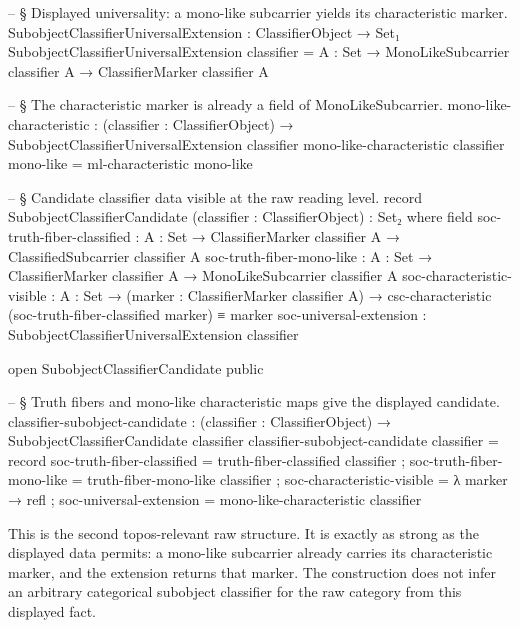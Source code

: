 \documentclass[11pt]{article}
\begin{document}
\begin{code}
-- § Displayed universality: a mono-like subcarrier yields its characteristic marker.
SubobjectClassifierUniversalExtension : ClassifierObject → Set₁
SubobjectClassifierUniversalExtension classifier =
  {A : Set} → MonoLikeSubcarrier classifier A → ClassifierMarker classifier A

-- § The characteristic marker is already a field of MonoLikeSubcarrier.
mono-like-characteristic :
  (classifier : ClassifierObject) → SubobjectClassifierUniversalExtension classifier
mono-like-characteristic classifier mono-like = ml-characteristic mono-like

-- § Candidate classifier data visible at the raw reading level.
record SubobjectClassifierCandidate (classifier : ClassifierObject) : Set₂ where
  field
    soc-truth-fiber-classified : {A : Set} →
                                 ClassifierMarker classifier A →
                                 ClassifiedSubcarrier classifier A
    soc-truth-fiber-mono-like  : {A : Set} →
                                 ClassifierMarker classifier A →
                                 MonoLikeSubcarrier classifier A
    soc-characteristic-visible : {A : Set} →
                                 (marker : ClassifierMarker classifier A) →
                                 csc-characteristic
                                   (soc-truth-fiber-classified marker) ≡ marker
    soc-universal-extension    : SubobjectClassifierUniversalExtension classifier

open SubobjectClassifierCandidate public

-- § Truth fibers and mono-like characteristic maps give the displayed candidate.
classifier-subobject-candidate :
  (classifier : ClassifierObject) → SubobjectClassifierCandidate classifier
classifier-subobject-candidate classifier = record
  { soc-truth-fiber-classified = truth-fiber-classified classifier
  ; soc-truth-fiber-mono-like  = truth-fiber-mono-like classifier
  ; soc-characteristic-visible = λ marker → refl
  ; soc-universal-extension    = mono-like-characteristic classifier
  }
\end{code}

This is the second topos-relevant raw structure.  It is exactly as strong as
the displayed data permits: a mono-like subcarrier already carries its
characteristic marker, and the extension returns that marker.  The construction
does not infer an arbitrary categorical subobject classifier for the raw
category from this displayed fact.
\end{document}
